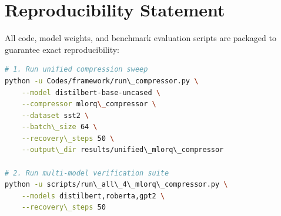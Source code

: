 \section{Reproducibility Statement}
All code, model weights, and benchmark evaluation scripts are packaged to guarantee exact reproducibility:
\begin{lstlisting}[language=bash]
# 1. Run unified compression sweep
python -u Codes/framework/run\_compressor.py \
    --model distilbert-base-uncased \
    --compressor mlorq\_compressor \
    --dataset sst2 \
    --batch\_size 64 \
    --recovery\_steps 50 \
    --output\_dir results/unified\_mlorq\_compressor

# 2. Run multi-model verification suite
python -u scripts/run\_all\_4\_mlorq\_compressor.py \
    --models distilbert,roberta,gpt2 \
    --recovery\_steps 50
\end{lstlisting}
